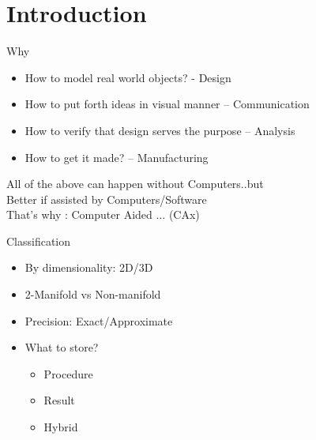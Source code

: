 \section{Introduction}
\begin{frame}{Why}
\begin{itemize}
\item How to model real world objects? - Design
\item How to put forth ideas in visual manner – Communication
\item How to verify that design serves the purpose – Analysis
\item How to get it made? – Manufacturing
\end{itemize}
All of the above can happen without Computers..but\\
Better if assisted by Computers/Software \\
\bigskip
That's why : Computer Aided $\ldots$ (CAx)
\end{frame}

\begin{frame}{Classification}
\begin{itemize}
\item By dimensionality: 2D/3D
\item 2-Manifold vs Non-manifold
\item Precision: Exact/Approximate
\item What to store?
	\begin{itemize}
	\item Procedure
	\item Result
	\item Hybrid
	\end{itemize}
\end{itemize}
\end{frame}

